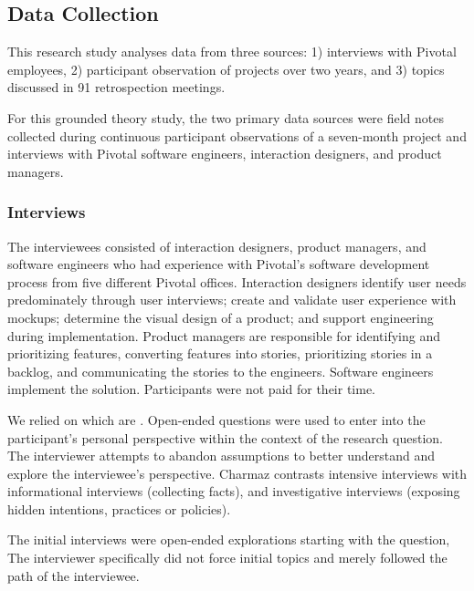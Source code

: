 \subsection{Data Collection}
This research study analyses data from three sources: 1) interviews with Pivotal employees, 2) participant observation of \numberOfObservedProjects{} projects over two years, and 3) topics discussed in 91 retrospection meetings. 


For this grounded theory study, the two primary data sources were field notes collected during continuous participant observations of a seven-month project and interviews with Pivotal software engineers, interaction designers, and product managers.


\subsubsection{Interviews}
The interviewees consisted of \numberOfInterviews{} interaction designers, product managers, and software engineers who had experience with Pivotal's software development process from five different Pivotal offices. Interaction designers identify user needs predominately through user interviews; create and validate user experience with mockups; determine the visual design of a product; and support engineering during implementation. Product managers are responsible for identifying and prioritizing features, converting features into stories, prioritizing stories in a backlog, and communicating the stories to the engineers. Software engineers implement the solution. Participants were not paid for their time. 


We relied on  which are  \cite{Charmaz}. Open-ended questions were used to enter into the participant's personal perspective within the context of the research question. The interviewer attempts to abandon assumptions to better understand and explore the interviewee's perspective. Charmaz \cite{Charmaz} contrasts intensive interviews with informational interviews (collecting facts), and investigative interviews (exposing hidden intentions, practices or policies).


The initial interviews were open-ended explorations starting with the question,  The interviewer specifically did not force initial topics and merely followed the path of the interviewee. 


